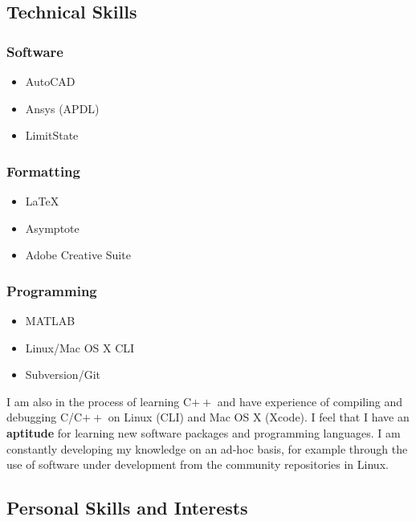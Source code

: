 \documentclass[oneside,a4paper]{article}
\begin{document}
\subsection*{Technical Skills}
\begin{multicols}{3}

\subsubsection*{Software}
\begin{itemize}
\item AutoCAD
\item Ansys (APDL)
\item LimitState
\end{itemize}

\subsubsection*{Formatting}
\begin{itemize}
\item \LaTeX
\item Asymptote
\item Adobe Creative Suite
\end{itemize}

\subsubsection*{Programming}
\begin{itemize}
\item MATLAB
\item Linux/Mac OS X CLI
\item Subversion/Git
\end{itemize}

\end{multicols}

I am also in the process of learning C$++$ and have experience of compiling and debugging C/C$++$ on Linux (CLI) and Mac OS X (Xcode). I feel that I have an {\bf aptitude} for learning new software packages and programming languages. I am constantly developing my knowledge on an ad-hoc basis, for example  through the use of software under development from the community repositories in Linux.

\subsection*{Personal Skills and Interests}
\end{document}
